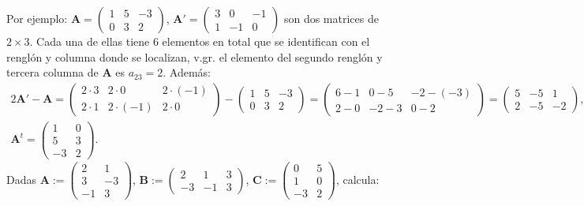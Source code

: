 \documentclass[8pt,a4paper]{article}
\begin{document}
\begin{enumerate}
Por ejemplo: $\mathbf{A}=\begin{pmatrix} 1 & 5 & -3 \\ 0 & 3 & 2 \end{pmatrix}$, $\mathbf{A}'=\begin{pmatrix} 3 & 0 & -1 \\ 1 & -1 & 0 \end{pmatrix}$ son dos matrices de $2\times3$. Cada una de ellas tiene 6 elementos en total que se identifican con el renglón y columna donde se localizan, v.gr. el elemento del segundo renglón y tercera columna de $\mathbf{A}$ es $a_{23}=2$. Además:
%
	\begin{gather*}
		2\mathbf{A}'-\mathbf{A}=\begin{pmatrix} 2\cdot 3 & 2\cdot 0 & 2\cdot (-1) \\ 2\cdot 1 & 2\cdot (-1) & 2\cdot 0 \end{pmatrix}-\begin{pmatrix} 1 & 5 & -3 \\ 0 & 3 & 2 \end{pmatrix}=\begin{pmatrix} 6-1 & 0-5 & -2-(-3) \\ 2-0 & -2-3 & 0-2 \end{pmatrix}=\begin{pmatrix} 5 & -5 & 1 \\ 2 & -5 & -2	\end{pmatrix}, \\
		\mathbf{A}^t=\begin{pmatrix} 1 & 0 \\ 5 & 3 \\ -3 & 2 \end{pmatrix}.
	\end{gather*}
%
Dadas $\displaystyle \mathbf{A}:=\begin{pmatrix} 2 & 1 \\ 3 & -3 \\ -1 & 3 \end{pmatrix}$, $\displaystyle \mathbf{B}:=\begin{pmatrix} 2 & 1 & 3 \\ -3 & -1 & 3 \end{pmatrix}$, $\displaystyle \mathbf{C}:=\begin{pmatrix} 0 & 5 \\ 1 & 0 \\ -3 & 2 \end{pmatrix}$, calcula:


\end{enumerate}
\end{document}
